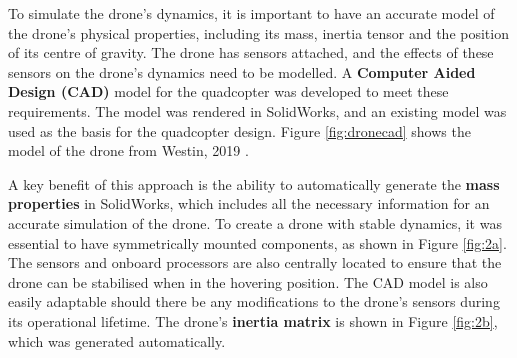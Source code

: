 To simulate the drone's dynamics, it is important to have an accurate model of the drone's physical properties, including its mass, inertia tensor and the position of its centre of gravity. The drone has sensors attached, and the effects of these sensors on the drone's dynamics need to be modelled. A \textbf{Computer Aided Design (CAD)} model for the quadcopter was developed to meet these requirements. The model was rendered in SolidWorks, and an existing model was used as the basis for the quadcopter design. Figure \ref{fig:dronecad} shows the model of the drone from Westin, 2019 \cite{westin2019x4}. 

A key benefit of this approach is the ability to automatically generate the \textbf{mass properties} in SolidWorks, which includes all the necessary information for an accurate simulation of the drone. To create a drone with stable dynamics, it was essential to have symmetrically mounted components, as shown in Figure \ref{fig:2a}. The sensors and onboard processors are also centrally located to ensure that the drone can be stabilised when in the hovering position. The CAD model is also easily adaptable should there be any modifications to the drone's sensors during its operational lifetime. The drone's \textbf{inertia matrix} is shown in Figure \ref{fig:2b}, which was generated automatically.

